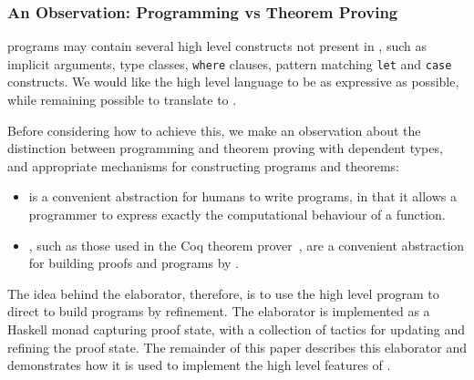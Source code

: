 
\subsubsection{An Observation: Programming vs Theorem Proving}

\Idris{} programs may contain several high level constructs not present in \TT{}, such
as implicit arguments, type classes, \texttt{where} clauses, pattern matching \texttt{let}
and \texttt{case} constructs. We would like the high level language to be as expressive
as possible, while remaining possible to translate to \TT{}.

Before considering how to achieve this, we make an observation about the distinction between
programming and theorem proving with dependent types, and appropriate mechanisms for
constructing programs and theorems:

\begin{itemize}
\item {} is a convenient abstraction for humans to write
programs, in that it allows a programmer to express exactly the computational
behaviour of a function.
\item {}, such as those used in the Coq theorem
prover~\cite{Bertot2004}, are a convenient abstraction for building proofs and
programs by .
\end{itemize}

The idea behind the \Idris{} elaborator, therefore, is to use the high level
program to direct  to build \TT{} programs by refinement.  The
elaborator is implemented as a Haskell monad capturing proof state, with a
collection of tactics for updating and refining the proof state.  The remainder
of this paper describes this elaborator and demonstrates how it is used to
implement the high level features of \Idris{}.



